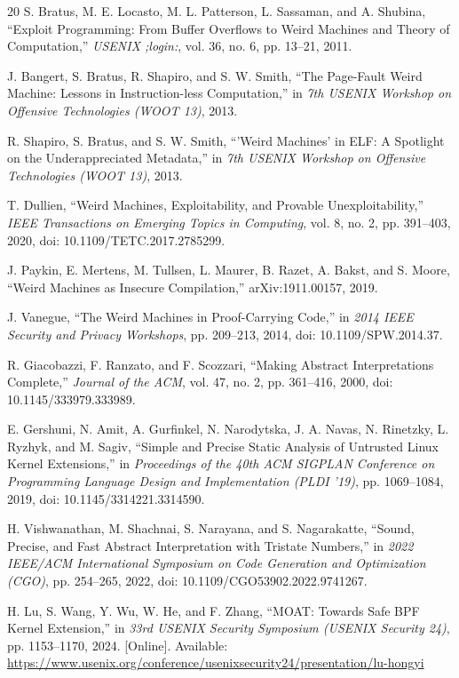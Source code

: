 \documentclass[conference]{IEEEtran}
\begin{document}
\begin{thebibliography}{20}
S. Bratus, M. E. Locasto, M. L. Patterson, L. Sassaman, and A. Shubina, ``Exploit Programming: From Buffer Overflows to Weird Machines and Theory of Computation,'' \emph{USENIX ;login:}, vol. 36, no. 6, pp. 13--21, 2011.

J. Bangert, S. Bratus, R. Shapiro, and S. W. Smith, ``The Page-Fault Weird Machine: Lessons in Instruction-less Computation,'' in \emph{7th USENIX Workshop on Offensive Technologies (WOOT 13)}, 2013.

R. Shapiro, S. Bratus, and S. W. Smith, ``'Weird Machines' in ELF: A Spotlight on the Underappreciated Metadata,'' in \emph{7th USENIX Workshop on Offensive Technologies (WOOT 13)}, 2013.

T. Dullien, ``Weird Machines, Exploitability, and Provable Unexploitability,'' \emph{IEEE Transactions on Emerging Topics in Computing}, vol. 8, no. 2, pp. 391--403, 2020, doi: 10.1109/TETC.2017.2785299.

J. Paykin, E. Mertens, M. Tullsen, L. Maurer, B. Razet, A. Bakst, and S. Moore, ``Weird Machines as Insecure Compilation,'' arXiv:1911.00157, 2019.

J. Vanegue, ``The Weird Machines in Proof-Carrying Code,'' in \emph{2014 IEEE Security and Privacy Workshops}, pp. 209--213, 2014, doi: 10.1109/SPW.2014.37.

R. Giacobazzi, F. Ranzato, and F. Scozzari, ``Making Abstract Interpretations Complete,'' \emph{Journal of the ACM}, vol. 47, no. 2, pp. 361--416, 2000, doi: 10.1145/333979.333989.

E. Gershuni, N. Amit, A. Gurfinkel, N. Narodytska, J. A. Navas, N. Rinetzky, L. Ryzhyk, and M. Sagiv, ``Simple and Precise Static Analysis of Untrusted Linux Kernel Extensions,'' in \emph{Proceedings of the 40th ACM SIGPLAN Conference on Programming Language Design and Implementation (PLDI '19)}, pp. 1069--1084, 2019, doi: 10.1145/3314221.3314590.

H. Vishwanathan, M. Shachnai, S. Narayana, and S. Nagarakatte, ``Sound, Precise, and Fast Abstract Interpretation with Tristate Numbers,'' in \emph{2022 IEEE/ACM International Symposium on Code Generation and Optimization (CGO)}, pp. 254--265, 2022, doi: 10.1109/CGO53902.2022.9741267.

H. Lu, S. Wang, Y. Wu, W. He, and F. Zhang, ``MOAT: Towards Safe BPF Kernel Extension,'' in \emph{33rd USENIX Security Symposium (USENIX Security 24)}, pp. 1153--1170, 2024. [Online]. Available: \url{https://www.usenix.org/conference/usenixsecurity24/presentation/lu-hongyi}

\end{thebibliography}
\end{document}

